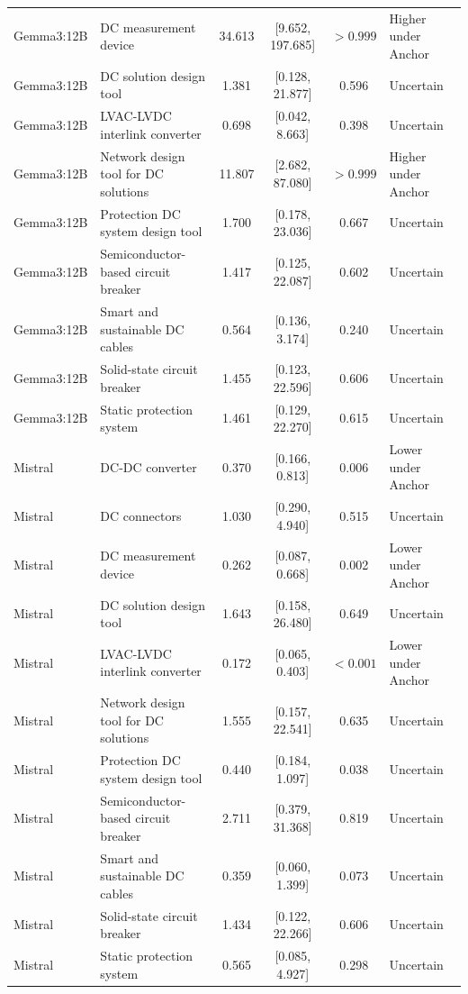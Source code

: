 \begin{longtable}[tbp]{p{2.2cm}p{5.0cm}cccp{3.2cm}}
Gemma3:12B & DC measurement device & 34.613 & [9.652, 197.685] & $>0.999$ & Higher under Anchor \\
Gemma3:12B & DC solution design tool & 1.381 & [0.128, 21.877] & 0.596 & Uncertain \\
Gemma3:12B & LVAC-LVDC interlink converter & 0.698 & [0.042, 8.663] & 0.398 & Uncertain \\
Gemma3:12B & Network design tool for DC solutions & 11.807 & [2.682, 87.080] & $>0.999$ & Higher under Anchor \\
Gemma3:12B & Protection DC system design tool & 1.700 & [0.178, 23.036] & 0.667 & Uncertain \\
Gemma3:12B & Semiconductor-based circuit breaker & 1.417 & [0.125, 22.087] & 0.602 & Uncertain \\
Gemma3:12B & Smart and sustainable DC cables & 0.564 & [0.136, 3.174] & 0.240 & Uncertain \\
Gemma3:12B & Solid-state circuit breaker & 1.455 & [0.123, 22.596] & 0.606 & Uncertain \\
Gemma3:12B & Static protection system & 1.461 & [0.129, 22.270] & 0.615 & Uncertain \\
Mistral & DC-DC converter & 0.370 & [0.166, 0.813] & 0.006 & Lower under Anchor \\
Mistral & DC connectors & 1.030 & [0.290, 4.940] & 0.515 & Uncertain \\
Mistral & DC measurement device & 0.262 & [0.087, 0.668] & 0.002 & Lower under Anchor \\
Mistral & DC solution design tool & 1.643 & [0.158, 26.480] & 0.649 & Uncertain \\
Mistral & LVAC-LVDC interlink converter & 0.172 & [0.065, 0.403] & $<0.001$ & Lower under Anchor \\
Mistral & Network design tool for DC solutions & 1.555 & [0.157, 22.541] & 0.635 & Uncertain \\
Mistral & Protection DC system design tool & 0.440 & [0.184, 1.097] & 0.038 & Uncertain \\
Mistral & Semiconductor-based circuit breaker & 2.711 & [0.379, 31.368] & 0.819 & Uncertain \\
Mistral & Smart and sustainable DC cables & 0.359 & [0.060, 1.399] & 0.073 & Uncertain \\
Mistral & Solid-state circuit breaker & 1.434 & [0.122, 22.266] & 0.606 & Uncertain \\
Mistral & Static protection system & 0.565 & [0.085, 4.927] & 0.298 & Uncertain \\

\end{longtable}
